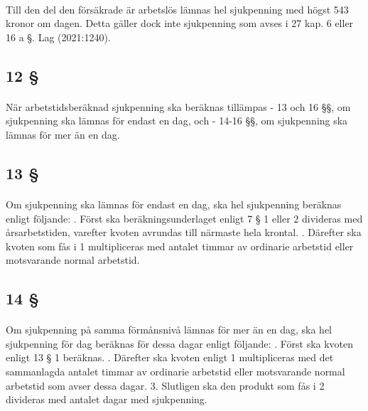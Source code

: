 \documentclass[a4paper,notitlepage,openany,10pt]{book}
\begin{document}
\paragraph*{}
Till den del den försäkrade är arbetslös lämnas hel sjukpenning med högst 543 kronor om dagen. Detta gäller dock inte sjukpenning som avses i 27 kap. 6 eller 16 a §.
Lag (2021:1240).
\subsection*{12 §}
\paragraph*{}
När arbetstidsberäknad sjukpenning ska beräknas tillämpas
\newline - 13 och 16 §§, om sjukpenning ska lämnas för endast en dag, och
\newline - 14-16 §§, om sjukpenning ska lämnas för mer än en dag.
\subsection*{13 §}
\paragraph*{}
Om sjukpenning ska lämnas för endast en dag, ska hel sjukpenning beräknas enligt följande:
. Först ska beräkningsunderlaget enligt 7 § 1 eller 2 divideras med årsarbetstiden, varefter kvoten avrundas till närmaste hela krontal.
. Därefter ska kvoten som fås i 1 multipliceras med antalet timmar av ordinarie arbetstid eller motsvarande normal arbetstid.
\subsection*{14 §}
\paragraph*{}
Om sjukpenning på samma förmånsnivå lämnas för mer än en dag, ska hel sjukpenning för dag beräknas för dessa dagar enligt följande:
. Först ska kvoten enligt 13 § 1 beräknas.
. Därefter ska kvoten enligt 1 multipliceras med det sammanlagda antalet timmar av ordinarie arbetstid eller motsvarande normal arbetstid som avser dessa dagar. 3. Slutligen ska den produkt som fås i 2 divideras med antalet dagar med sjukpenning.
\end{document}
